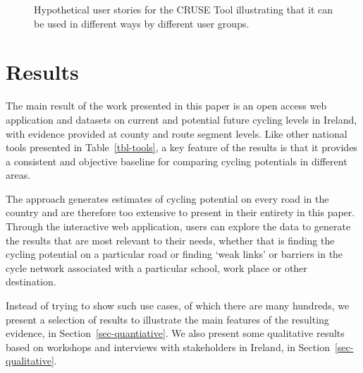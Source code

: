 \documentclass[
  super,
  preprint,
  3p]{elsarticle}
\begin{document}
\begin{figure}


\caption{\label{fig-user-stories}Hypothetical user stories for the CRUSE
Tool illustrating that it can be used in different ways by different
user groups.}

\end{figure}%

\section{Results}\label{sec-results}

The main result of the work presented in this paper is an open access
web application and datasets on current and potential future cycling
levels in Ireland, with evidence provided at county and route segment
levels. Like other national tools presented in Table~\ref{tbl-tools}, a
key feature of the results is that it provides a consistent and
objective baseline for comparing cycling potentials in different areas.

The approach generates estimates of cycling potential on every road in
the country and are therefore too extensive to present in their entirety
in this paper. Through the interactive web application, users can
explore the data to generate the results that are most relevant to their
needs, whether that is finding the cycling potential on a particular
road or finding `weak links' or barriers in the cycle network associated
with a particular school, work place or other destination.

Instead of trying to show such use cases, of which there are many
hundreds, we present a selection of results to illustrate the main
features of the resulting evidence, in Section~\ref{sec-quantiative}. We
also present some qualitative results based on workshops and interviews
with stakeholders in Ireland, in Section~\ref{sec-qualitative}.
\end{document}
